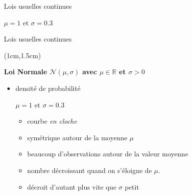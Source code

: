 \documentclass{beamer}
\begin{document}
\begin{frame}{Lois usuelles continues}
\begin{textblock*}{\textwidth}
\begin{itemize}
\begin{center}
\begin{minipage}{0.4\textwidth}
\begin{center}
$\mu=1$ et $\sigma=0.3$
\end{center}
\end{minipage}
\end{center}

\end{itemize}

 \end{textblock*}

\end{frame}



\begin{frame}{Lois usuelles continues}
\begin{textblock*}{\textwidth}(1cm,1.5cm)

\begin{center}{\bf \Large Loi Normale $\mathcal{N}(\mu,\sigma)$ avec $\mu\in \mathbb{R}$ et $\sigma>0$} \end{center}
\begin{itemize}
\item \small densité de probabilité 
\begin{center}
\begin{minipage}{0.25\textwidth}
\begin{center}

$\mu=1$ et $\sigma=0.3$

\end{center}
\end{minipage}
\quad
\begin{minipage}{0.6\textwidth}
\begin{itemize}
\item courbe {\it en cloche}
\item symétrique autour de la moyenne $\mu$
\item beaucoup d'observations autour de la valeur moyenne
\item nombre décroissant quand on s'éloigne
de $\mu$.
\item décroit d'autant plus vite que $\sigma$ petit
\end{itemize}
\end{minipage}
\end{center}

\end{itemize}

 \end{textblock*}

\end{frame}
\end{document}
